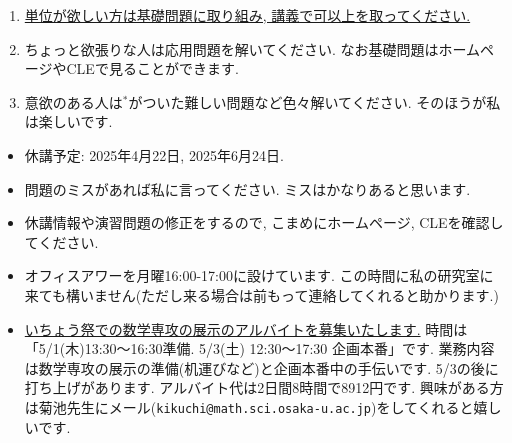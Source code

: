 \documentclass[dvipdfmx,a4paper,11pt]{article}
\theoremstyle{definition}
\begin{document}


\medskip
{}
\begin{enumerate}
  \setlength{\parskip}{0cm} 
  \setlength{\itemsep}{0cm} 
\item \underline{単位が欲しい方は基礎問題に取り組み, 講義で可以上を取ってください.} %
\item ちょっと欲張りな人は応用問題を解いてください. なお基礎問題はホームページやCLEで見ることができます.
\item 意欲のある人は$^{*}$がついた難しい問題など色々解いてください. そのほうが私は楽しいです.
\end{enumerate}




\medskip
{}
\begin{itemize}
  \setlength{\parskip}{0cm} %
  \setlength{\itemsep}{0cm} %
  \item 休講予定: 2025年4月22日, 2025年6月24日. 
    \item 問題のミスがあれば私に言ってください. ミスはかなりあると思います. 
  \item 休講情報や演習問題の修正をするので, こまめにホームページ, CLEを確認してください.
    \item オフィスアワーを月曜16:00-17:00に設けています. この時間に私の研究室に来ても構いません(ただし来る場合は前もって連絡してくれると助かります.)
      \item \underline{いちょう祭での数学専攻の展示のアルバイトを募集いたします.} 時間は「5/1(木)13:30〜16:30準備. 5/3(土) 12:30〜17:30 企画本番」です. 業務内容は数学専攻の展示の準備(机運びなど)と企画本番中の手伝いです. 5/3の後に打ち上げがあります. アルバイト代は2日間8時間で8912円です. 興味がある方は菊池先生にメール(\texttt{kikuchi@math.sci.osaka-u.ac.jp})をしてくれると嬉しいです. 
 \end{itemize}
 
\end{document}
